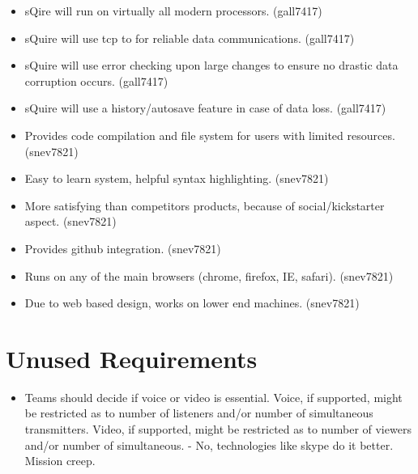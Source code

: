 \documentclass[11pt]{report}
\begin{document}
\begin{itemize}
            \item sQire will run on virtually all modern processors. (gall7417)
            \item sQuire will use tcp to for reliable data communications. (gall7417)
            \item sQuire will use error checking upon large changes to ensure no drastic data corruption occurs. (gall7417)
            \item sQuire will use a history/autosave feature in case of data loss. (gall7417)
            \item Provides code compilation and file system for users with limited resources. (snev7821)
            \item Easy to learn system, helpful syntax highlighting. (snev7821)
            \item More satisfying than competitors products, because of social/kickstarter aspect. (snev7821)
            \item Provides github integration. (snev7821)
            \item Runs on any of the main browsers (chrome, firefox, IE, safari). (snev7821)
            \item Due to web based design, works on lower end machines. (snev7821)
    \end{itemize}

\section{Unused Requirements}
    \begin{itemize}
        \item Teams should decide if voice or video is essential. Voice, if supported, might be restricted as to number of listeners and/or number of simultaneous transmitters. Video, if supported, might be restricted as to number of viewers and/or number of simultaneous. - No, technologies like skype do it better. Mission creep.
    \end{itemize}
    
\end{document}
